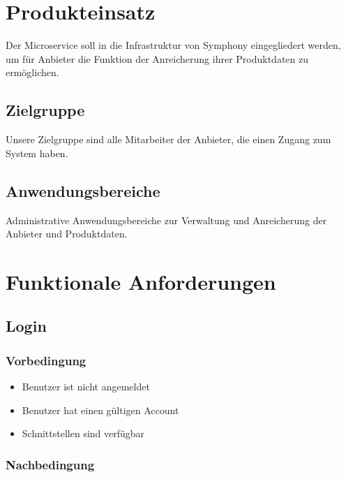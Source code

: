 \documentclass[a4paper,12pt]{article}
\begin{document}
\section{Produkteinsatz}
Der Microservice soll in die Infrastruktur von Symphony eingegliedert werden, um für Anbieter die Funktion der Anreicherung ihrer Produktdaten zu ermöglichen.

\subsection{Zielgruppe}
Unsere Zielgruppe sind alle Mitarbeiter der Anbieter, die einen Zugang zum System haben.

\subsection{Anwendungsbereiche}
Administrative Anwendungsbereiche zur Verwaltung und Anreicherung der Anbieter und Produktdaten.

\section{Funktionale Anforderungen}
\subsection{Login}\label{login}

\subsubsection{Vorbedingung}\label{vorbedingung}

\begin{itemize}
\item
  Benutzer ist nicht angemeldet
\item
  Benutzer hat einen gültigen Account
\item
  Schnittstellen sind verfügbar
\end{itemize}

\subsubsection{Nachbedingung}\label{nachbedingung}
\end{document}
